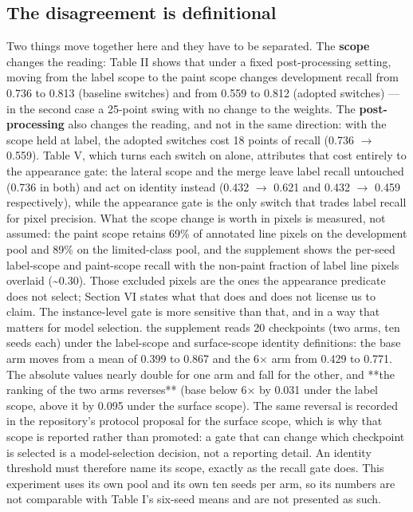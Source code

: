 \documentclass[journal]{IEEEtran}
\begin{document}
\subsection{The disagreement is definitional}
Two things move together here and they have to be separated. The \textbf{scope} changes the reading: Table II
shows that under a fixed post-processing setting, moving from the label scope to the paint scope changes
development recall from 0.736 to 0.813 (baseline switches) and from 0.559 to 0.812 (adopted switches) --- in
the second case a 25-point swing with no change to the weights. The \textbf{post-processing} also changes the reading, and not in the same direction: with the scope held at label, the adopted switches cost 18 points of recall (0.736 $\rightarrow$ 0.559). Table V, which turns each switch on alone, attributes that cost entirely to the appearance gate: the lateral scope and the merge leave label recall untouched (0.736 in both) and act on identity instead (0.432 $\rightarrow$ 0.621 and 0.432 $\rightarrow$ 0.459 respectively), while the appearance gate is the only switch that trades label recall for pixel precision. What the scope change is worth in pixels is measured, not assumed:
the paint scope retains 69\% of annotated line pixels on the development pool and 89\% on the limited-class
pool, and the supplement shows the per-seed label-scope and paint-scope recall with the non-paint fraction of
label line pixels overlaid (\textasciitilde{}0.30). Those excluded pixels are the ones the appearance predicate does not
select; Section VI states what that does and does not license us to claim.
The instance-level gate is more sensitive than that, and in a way that matters for model selection.
the supplement reads 20 checkpoints (two arms, ten seeds each) under the label-scope and surface-scope
identity definitions: the base arm moves from a mean of 0.399 to 0.867 and the 6$\times$ arm from 0.429 to 0.771.
The absolute values nearly double for one arm and fall for the other, and **the ranking of the two arms
reverses** (base below 6$\times$ by 0.031 under the label scope, above it by 0.095 under the surface scope). The
same reversal is recorded in the repository's protocol proposal for the surface scope, which is why that
scope is reported rather than promoted: a gate that can change which checkpoint is selected is a
model-selection decision, not a reporting detail. An identity threshold must therefore name its scope,
exactly as the recall gate does. This experiment uses its own pool and its own ten seeds per arm, so its
numbers are not comparable with Table I's six-seed means and are not presented as such.
\end{document}
